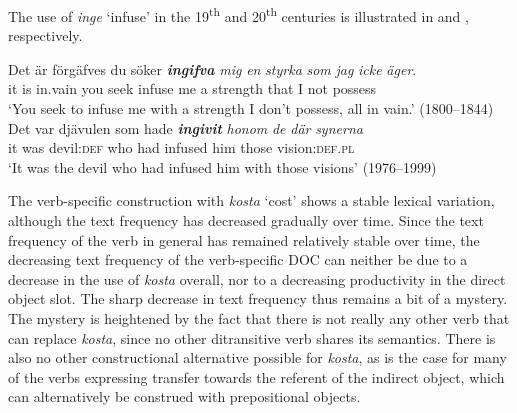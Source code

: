 \documentclass[output=paper]{langscibook}
\begin{document}
The use of \textit{inge} ‘infuse’ in the 19\textsuperscript{th} and 20\textsuperscript{th} centuries is illustrated in  and , respectively.


\ea \label{ex:valdeson:24}
\gll Det   är förgäfves du   söker \textbf{\textit{ingifva}} \textit{mig} \textit{en} \textit{styrka} \textit{som} \textit{jag} \textit{icke} \textit{äger}.\\
  it       is    in.vain     you   seek     infuse       me   a   strength that   I   not   possess\\
\glt `You seek to infuse me with a strength I don’t possess, all in vain.’ (1800–1844)
\ex \label{ex:valdeson:25}
\gll Det var djävulen     som   hade \textbf{\textit{ingivit}} \textit{honom} {\textit{de} \textit{där}} \textit{synerna}\\
  it     was devil:\textsc{def}   who     had     infused   him     those      vision:\textsc{def.pl}\\
\glt `It was the devil who had infused him with those visions’ (1976–1999)
\z


\label{sec:valdeson:5.3.3.4}
    
The verb-specific construction with \textit{kosta} ‘cost’ shows a stable lexical variation, although the text frequency has decreased gradually over time. Since the text frequency of the verb in general has remained relatively stable over time, the decreasing text frequency of the verb-specific DOC can neither be due to a decrease in the use of \textit{kosta} overall, nor to a decreasing productivity in the direct object slot. The sharp decrease in text frequency thus remains a bit of a mystery. The mystery is heightened by the fact that there is not really any other verb that can replace \textit{kosta}, since no other ditransitive verb shares its semantics. There is also no other constructional alternative possible for \textit{kosta}, as is the case for many of the verbs expressing transfer towards the referent of the indirect object, which can alternatively be construed with prepositional objects.


\begin{table}
\caption{Frequency measures of the verb-specific DOC with \textit{kosta} ‘cost’}
\label{tab:valdeson:17}
\end{table}
\end{document}
